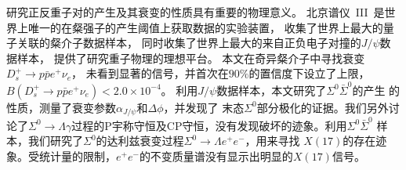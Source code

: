 ﻿
\secretcontent{}  %

\makeatletter

\makeatother








\begin{cabstract}
    研究正反重子对的产生及其衰变的性质具有重要的物理意义。
    北京谱仪~III~是世界上唯一的在粲强子的产生阈值上获取数据的实验装置，
    收集了世界上最大的量子关联的粲介子数据样本，
    同时收集了世界上最大的来自正负电子对撞的$J/\psi$数据样本，
    提供了研究重子物理的理想平台。
    本文在奇异粲介子中寻找衰变$D_{s}^{+} \to p \bar{p} e^{+} \nu_{e}$，
    未看到显著的信号，并首次在$90\%$的置信度下设立了上限，
    $B(D_{s}^{+} \to p \bar{p} e^{+} \nu_{e}) < 2.0 \times 10^{-4} $。
    利用$J/\psi$数据样本，本文研究了$\Sigma^{0}\bar{\Sigma}^{0}$的产生
    的性质，测量了衰变参数$\alpha_{J/\psi}$和$\Delta \phi$，并发现了
    末态$\Sigma^{0}$部分极化的证据。我们另外讨论了$\Sigma^{0} \to \Lambda
    \gamma$过程的P宇称守恒及CP守恒，没有发现破坏的迹象。利用$\Sigma^{0}\bar{\Sigma}^{0}$
    样本，我们研究了$\Sigma^{0}$的达利兹衰变过程$\Sigma^{0} \to \Lambda e^{+} e^{-}$，用来寻找
    $X(17)$的存在迹象。受统计量的限制，$e^{+}e^{-}$的不变质量谱没有显示出明显的$X(17)$信号。

\end{cabstract}

